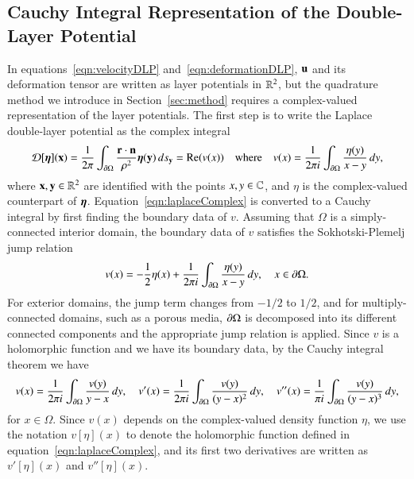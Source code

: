\documentclass[preprint,10pt]{elsarticle}
\begin{document}
\subsection{Cauchy Integral Representation of the Double-Layer
Potential}
\label{sec:DLPcomplex}
In equations~\eqref{eqn:velocityDLP} and~\eqref{eqn:deformationDLP},
${\mathbf{u}}$ and its deformation tensor are written as layer potentials in
${\mathbb{R}}^2$, but the quadrature method we introduce in
Section~\ref{sec:method} requires a complex-valued representation of the
layer potentials. The first step is to write the Laplace double-layer
potential as the complex integral
\begin{align}
  {\mathcal{D}}[{\boldsymbol\eta}]({\mathbf{x}}) = \frac{1}{2\pi} \int_{{\partial}\Omega} 
    \frac{{\mathbf{r}} \cdot {\mathbf{n}}}{\rho^2}{\boldsymbol\eta}({\mathbf{y}})\, ds_{\mathbf{y}} = {\operatorname{Re}} (v(x)) \quad 
    \text{where} \quad v(x) = \frac{1}{2\pi i} \int_{{\partial}\Omega}
    \frac{\eta(y)}{x - y} \, dy,
  \label{eqn:laplaceComplex}
\end{align}
where ${\mathbf{x}},{\mathbf{y}} \in {\mathbb{R}}^2$ are identified with the points $x,y \in {\mathbb{C}}$,
and $\eta$ is the complex-valued counterpart of ${\boldsymbol\eta}$.
Equation~\eqref{eqn:laplaceComplex} is converted to a Cauchy integral by
first finding the boundary data of $v$.  Assuming that $\Omega$ is a
simply-connected interior domain, the boundary data of $v$ satisfies the
Sokhotski-Plemelj jump relation
\begin{align}
  \label{eqn:SPrelation}
  v(x) = - \frac{1}{2} \eta(x) + \frac{1}{2\pi i} \int_{{\partial}\Omega}
    \frac{\eta(y)}{x-y}\, dy, \quad x \in {\partial}\Omega.
\end{align}
For exterior domains, the jump term changes from $-1/2$ to $1/2$, and
for multiply-connected domains, such as a porous media, ${\partial}\Omega$ is
decomposed into its different connected components and the appropriate
jump relation is applied.  Since $v$ is a holomorphic function and we
have its boundary data, by the Cauchy integral theorem we have
\begin{align}
  \label{eqn:cauchy}
  v(x) = \frac{1}{2\pi i}\int_{{\partial}\Omega} 
    \frac{v(y)}{y-x} \,dy, \quad
  v'(x) = \frac{1}{2\pi i} \int_{{\partial}\Omega}
    \frac{v(y)}{(y-x)^2} \, dy, \quad
  v''(x) = \frac{1}{\pi i} \int_{{\partial}\Omega}
    \frac{v(y)}{(y-x)^3} \, dy,
\end{align}
for $x \in \Omega$.  Since $v(x)$ depends on the complex-valued density
function $\eta$, we use the notation $v[\eta](x)$ to denote the
holomorphic function defined in equation~\eqref{eqn:laplaceComplex}, and
its first two derivatives are written as $v'[\eta](x)$ and
$v''[\eta](x)$.  
  
\end{document}
